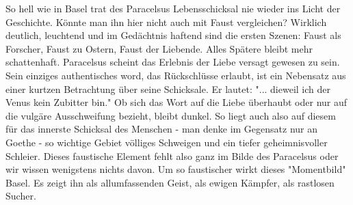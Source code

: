 \def\day{4.9.1942}
\mktitle

So hell wie in Basel trat des Paracelsus Lebensschicksal nie wieder ins Licht der Geschichte.
K\"{o}nnte man ihn hier nicht auch mit Faust vergleichen?
Wirklich deutlich, leuchtend und im Ged\"{a}chtnis haftend sind die ersten Szenen: Faust als Forscher, Faust zu Ostern, Faust der Liebende.
Alles Sp\"{a}tere bleibt mehr schattenhaft.
Paracelsus scheint das Erlebnis der Liebe versagt gewesen zu sein.
Sein einziges authentisches word, das R\"{u}ckschl\"{u}sse erlaubt, ist ein Nebensatz aus einer kurtzen Betrachtung \"{u}ber seine Schicksale.
Er lautet: "... dieweil ich der Venus kein Zubitter bin."
Ob sich das Wort auf die Liebe \"{u}berhaubt oder nur auf die vulg\"{a}re Ausschweifung bezieht, bleibt dunkel.
So liegt auch also auf diesem f\"{u}r das innerste Schicksal des Menschen - man denke im Gegensatz nur an Goethe - so wichtige Gebiet v\"{o}lliges Schweigen und ein tiefer geheimnisvoller Schleier.
Dieses faustische Element fehlt also ganz im Bilde des Paracelsus oder wir wissen wenigstens nichts davon.
Um so faustischer wirkt dieses "Momentbild" Basel.
Es zeigt ihn als allumfassenden Geist, als ewigen K\"{a}mpfer, als rastlosen Sucher.

\clearpage
